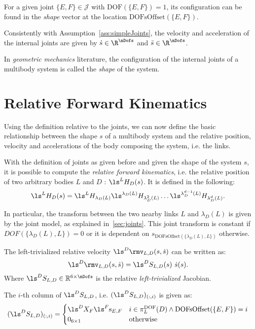 For a given joint $\{E,F\} \in \mathcal{J}$ with $\text{DOF}(\{E,F\} ) = 1$, its configuration can be found in the \emph{shape} vector at the location $\text{DOFsOffset}(\{E,F\})$.
 
Consistently with Assumption~\ref{ass:simpleJoints}, the velocity and acceleration of the internal joints are given by $\dot{s} \in \R^\nDofs$ and  $\ddot{s} \in \R^\nDofs$.

\begin{remark}
In \emph{geometric mechanics} literature, the configuration of the internal joints of a multibody system is called the \emph{shape} of the system.
\end{remark}
\section{Relative Forward Kinematics}
Using the definition relative to the joints, we can now define the basic relationship between the shape $s$ of a multibody system and the relative position, velocity and accelerations of the body composing the system, i.e. the links. 

With the definition of joints as given before and given the shape of the system $s$, it is possible to compute the \emph{relative forward kinematics}, i.e. the relative position of two arbitrary bodies $L$ and $D$ : $\ls^L H_D(s)$.
It is defined in the following:
\begin{equation}
\label{eq:relativeFwdKin}
    \ls^L H_D(s) = \ls^L H_{\lambda_D(L)} \ls^{\lambda_D(L)} H_{\lambda_D^{2}(L)} \dots \ls^{\lambda_D^{d-1}(L)} H_{\lambda_D^{d}(L)} .
\end{equation}

In particular, the transform between the two nearby links $L$ and $\lambda_D(L)$ is given by the joint model, as explained in~\ref{sec:joints}. This joint transform is constant if $DOF( \{ \lambda_{D}(L),L\}) = 0$ or it is dependent on  $s_{\text{DOFsOffset}(\{\lambda_D(L),L\})}$ otherwise. 

\begin{proposition}
The left-trivialized relative velocity $\ls^D \rmv_{L,D}(s,\dot{s})$ can be  written as:
\begin{equation}
\label{eq:relJacobDef}
    \ls^D \rmv_{L,D}(s,\dot{s}) = \ls^D S_{L,D}(s)~\dot{s}(s) .
\end{equation}
Where $\ls^D S_{L,D} \in \mathbb{R}^{6 \times \nDofs}$ is the relative \emph{left-trivialized} Jacobian.

The $i$-th column of $\ls^D S_{L,D}$, i.e. $(\ls^D S_{L,D})_{(:,i)}$ is given as:
\begin{equation}
    \label{eq:relativeJacobianDefinition}
    (\ls^D S_{L,D})_{(:,i)} = 
    \begin{cases} 
      \ls^D X_F \ls^F 
      \mathrm{s}_{E,F} & i \in  \pi^{\text{DOF}}_L(D) \land \text{DOFsOffset}(\{E,F\}) = i \\
        0_{6 \times 1} & \text{otherwise} 
   \end{cases}
\end{equation}
\end{proposition}

